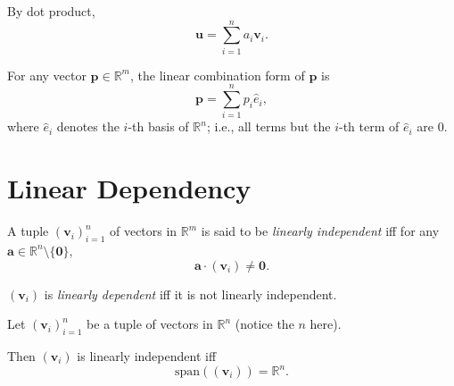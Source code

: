 \begin{note}
	By dot product,
	$$
	\mathbf u = \sum_{i = 1}^n a_i \mathbf v_i.
	$$
\end{note}


\begin{note}
	For any vector $\mathbf p \in \mathbb R^m$, the linear combination form of $\mathbf p$ is
	$$
	\mathbf p = \sum_{i = 1}^n p_i \hat e_i,
	$$
	where $\hat e_i$ denotes the $i$-th basis of $\mathbb R^n$; i.e., all terms but the $i$-th term of $\hat e_i$ are $0$.
\end{note}





\section{Linear Dependency}



\begin{definition}
	\label{def: linear dependency}	
	A tuple $(\mathbf v_i)_{i = 1}^{n}$ of vectors in $\mathbb R^m$ is said to be \textit{linearly independent} iff for any $\mathbf a \in \mathbb R^n \setminus \{\mathbf 0\}$,
	$$
	\mathbf a \cdot (\mathbf v_i) \ne \mathbf 0.
	$$
	
	$(\mathbf v_i)$ is \textit{linearly dependent} iff it is not linearly independent.
\end{definition}



\begin{lemma}
	Let $(\mathbf v_i)_{i = 1}^n$ be a tuple of vectors in $\mathbb R^n$ (notice the $n$ here).
	
	Then $(\mathbf v_i)$ is linearly independent iff
	$$
	\mathrm{span}((\mathbf v_i)) = \mathbb R^n.
	$$
\end{lemma}















































%